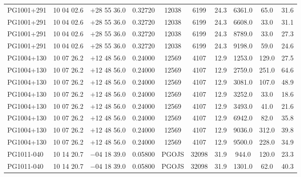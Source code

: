 \begin{landscape}
\begin{center}
\begin{longtable}{l c c c c c c c c c}
PG1001+291  &              10 04 02.6  &         $+$28 55 36.0  &       0.32720  & 12038  &   6199  &       24.3  &      6361.0  &  65.0  &   31.6  \\
PG1001+291  &              10 04 02.6  &         $+$28 55 36.0  &       0.32720  & 12038  &   6199  &       24.3  &      6608.0  &  33.0  &   31.1  \\
PG1001+291  &              10 04 02.6  &         $+$28 55 36.0  &       0.32720  & 12038  &   6199  &       24.3  &      8789.0  &  33.0  &   27.3  \\
PG1001+291  &              10 04 02.6  &         $+$28 55 36.0  &       0.32720  & 12038  &   6199  &       24.3  &      9198.0  &  59.0  &   24.6  \\
PG1004+130  &              10 07 26.2  &         $+$12 48 56.0  &       0.24000  & 12569  &   4107  &       12.9  &      1253.0  &  129.0  &  27.5  \\
PG1004+130  &              10 07 26.2  &         $+$12 48 56.0  &       0.24000  & 12569  &   4107  &       12.9  &      2759.0  &  251.0  &  64.6  \\
PG1004+130  &              10 07 26.2  &         $+$12 48 56.0  &       0.24000  & 12569  &   4107  &       12.9  &      3081.0  &  107.0  &  48.9  \\
PG1004+130  &              10 07 26.2  &         $+$12 48 56.0  &       0.24000  & 12569  &   4107  &       12.9  &      3252.0  &  33.0  &   18.6  \\
PG1004+130  &              10 07 26.2  &         $+$12 48 56.0  &       0.24000  & 12569  &   4107  &       12.9  &      3493.0  &  41.0  &   21.6  \\
PG1004+130  &              10 07 26.2  &         $+$12 48 56.0  &       0.24000  & 12569  &   4107  &       12.9  &      6942.0  &  82.0  &   35.8  \\
PG1004+130  &              10 07 26.2  &         $+$12 48 56.0  &       0.24000  & 12569  &   4107  &       12.9  &      9036.0  &  312.0  &  39.8  \\
PG1004+130  &              10 07 26.2  &         $+$12 48 56.0  &       0.24000  & 12569  &   4107  &       12.9  &      9500.0  &  228.0  &  34.9  \\
PG1011-040  &              10 14 20.7  &         $-$04 18 39.0  &       0.05800  & PGOJS  &   32098  &      31.9  &      944.0  &   120.0  &  23.3  \\
PG1011-040  &              10 14 20.7  &         $-$04 18 39.0  &       0.05800  & PGOJS  &   32098  &      31.9  &      1301.0  &  62.0  &   40.3  \\

\end{longtable}
\end{center}
\end{landscape}
